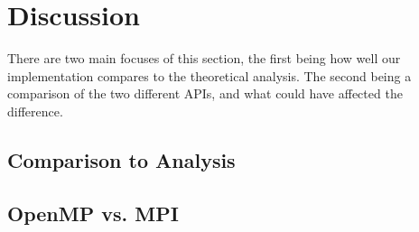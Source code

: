 \documentclass[11pt]{article}
\begin{document}
\section{Discussion}
There are two main focuses of this section, the first being how well our implementation compares to the theoretical analysis. The second being a comparison of the two different APIs, and what could have affected the difference.
\subsection{Comparison to Analysis}

\subsection{OpenMP vs. MPI}

\end{document}
